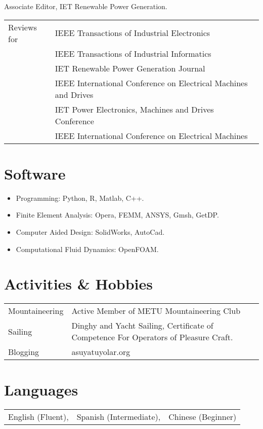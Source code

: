\documentclass[a4paper,12pt]{article}
\begin{document}
Associate Editor, IET Renewable Power Generation.

\begin{tabular}{ll}
Reviews for & IEEE Transactions of Industrial Electronics \\
& IEEE Transactions of Industrial Informatics \\
& IET Renewable Power Generation Journal \\
& IEEE International Conference on Electrical Machines and Drives \\
& IET Power Electronics, Machines and Drives Conference \\
& IEEE International Conference on Electrical Machines\\
\end{tabular}


\section{Software}
\begin{itemize}
\item Programming: Python, R, Matlab, C++.
\item Finite Element Analysis: Opera, FEMM, ANSYS, Gmsh, GetDP.
\item Computer Aided Design: SolidWorks, AutoCad.
\item Computational Fluid Dynamics: OpenFOAM.
\end{itemize}

\section{Activities \& Hobbies}
\begin{tabular}{ll}
Mountaineering & Active Member of METU Mountaineering Club\\
Sailing & Dinghy and Yacht Sailing, Certificate of Competence For Operators of Pleasure Craft. \\
Blogging & asuyatuyolar.org\\
\end{tabular}

\section{Languages}
\begin{tabular}{lll} 
English (Fluent), & Spanish (Intermediate), & Chinese (Beginner)
\end{tabular}


\begin{publications}
\end{publications}
\end{document}
